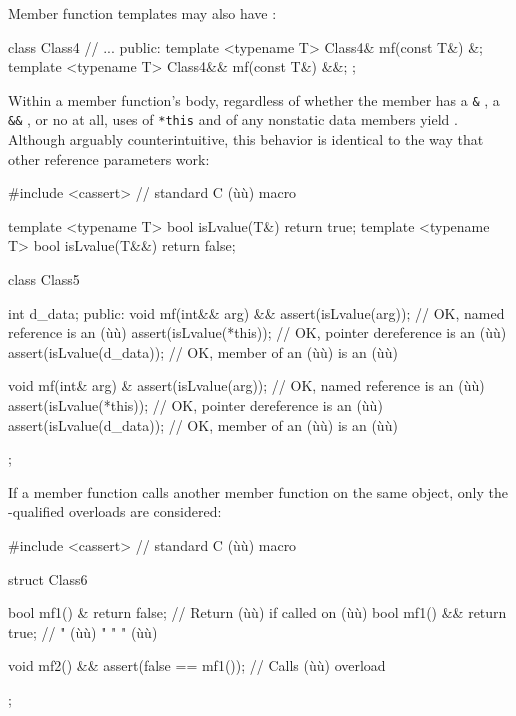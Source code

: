 Member function templates may also have :

\begin{emcppslisting}[emcppsbatch=e2]
class Class4
{
    // ...
public:
    template <typename T> Class4&  mf(const T&) &;
    template <typename T> Class4&& mf(const T&) &&;
};
\end{emcppslisting}
    

\noindent Within a member function's body, regardless of whether the member has a
\lstinline!&! , a \lstinline!&&!
, or no  at all, uses of
\lstinline!*this! and of any nonstatic data members yield .
Although arguably counterintuitive, this behavior is identical to the
way that other reference parameters work:

\begin{emcppslisting}[emcppsbatch=e2]
#include <cassert>  // standard C (ù{}ù) macro

template <typename T> bool isLvalue(T&)  { return true; }
template <typename T> bool isLvalue(T&&) { return false; }

class Class5
{
    int d_data;
public:
    void mf(int&& arg) &&
    {
        assert(isLvalue(arg));     // OK, named reference is an (ù{}ù)
        assert(isLvalue(*this));   // OK, pointer dereference is an (ù{}ù)
        assert(isLvalue(d_data));  // OK, member of an (ù{}ù) is an (ù{}ù)
    }

    void mf(int& arg) &
    {
        assert(isLvalue(arg));     // OK, named reference is an (ù{}ù)
        assert(isLvalue(*this));   // OK, pointer dereference is an (ù{}ù)
        assert(isLvalue(d_data));  // OK, member of an (ù{}ù) is an (ù{}ù)
    }
};
\end{emcppslisting}
    

\noindent If a member function calls another member function on the same object,
only the -qualified overloads are considered:

\begin{emcppslisting}[emcppsbatch=e2]
#include <cassert>  // standard C (ù{}ù) macro

struct Class6
{
    bool mf1() &  { return false; }  // Return (ù{}ù) if called on (ù{}ù)
    bool mf1() && { return true; }   //    "   (ù{}ù)   "    "    " (ù{}ù)

    void mf2() && { assert(false == mf1()); }  // Calls (ù{}ù) overload
};
\end{emcppslisting}
    

